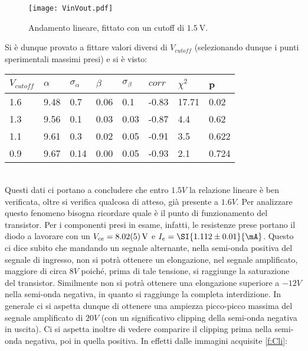 \begin{figure}
\centering
	\texttt{[image: VinVout.pdf]}
	\caption{Andamento lineare, fittato con un cutoff di $\SI{1.5}{\V}$.\label{f:VinVout}}
\end{figure}

Si è dunque provato a fittare valori diversi di $V_{cutoff}$ (selezionando dunque i punti sperimentali massimi presi) e si è visto:\\

\begin{tabular}{l l l l l l l l}
$V_{cutoff}$ 	&	$\alpha$	&	$\sigma_\alpha$	&	$\beta$ & $\sigma_\beta$ & $corr$ & $\chi^2$ & p\\
\hline
1.6 & 9.48 & 0.7 & 0.06 & 0.1& -0.83 & 17.71 & 0.02\\
1.3 & 9.56 & 0.1 & 0.03 & 0.03 & -0.87 & 4.4   & 0.62\\
1.1 & 9.61 & 0.3 & 0.02 & 0.05& -0.91 & 3.5   & 0.622\\
0.9 & 9.67 & 0.14& 0.00 & 0.05& -0.93 & 2.1	& 0.724\\
\end{tabular}
\\

Questi dati ci portano a concludere che entro $1.5 V$ la relazione lineare è ben verificata, oltre si verifica qualcosa di atteso, già presente a $1.6 V$. Per analizzare questo fenomeno bisogna ricordare quale è il punto di funzionamento del transistor. Per i componenti presi in esame, infatti, le resistenze prese portano il diodo a lavorare con un $V_{ce}=\SI{8.02\pm 0.05}{V}$ e $I_e=\SI{1.112\pm 0.01}{\mA}$. Questo ci dice subito che mandando un segnale alternante, nella semi-onda positiva del segnale di ingresso, non si potrà ottenere un elongazione, nel segnale amplificato, maggiore di circa $8V$ poiché, prima di tale tensione, si raggiunge la saturazione del transistor.  Similmente non si potrà ottenere una elongazione superiore a $-12V$ nella semi-onda negativa, in quanto si raggiunge la completa interdizione. In generale ci si aspetta dunque di ottenere una ampiezza picco-picco massima del segnale amplificato di $20V$ (con un significativo clipping della semi-onda negativa in uscita). Ci si aspetta inoltre di vedere comparire il clipping prima nella semi-onda negativa, poi in quella positiva. In effetti dalle immagini acquisite \ref{f:Cli}:


